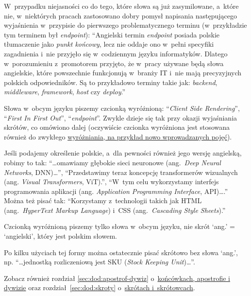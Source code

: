 W~przypadku niejasności co do tego, które słowa są już zasymilowane, a~które nie, w~niektórych pracach zastosowano dobry pomysł napisania następującego wyjaśnienia w~przypisie do pierwszego problematycznego terminu (w~przykładzie tym terminem był {\em endpoint}): ``Angielski termin {\em endpoint} posiada polskie tłumaczenie jako {\em punkt końcowy}, lecz nie oddaje ono w~pełni specyfiki zagadnienia i~nie przyjęło się w~codziennym języku informatyków. Dlatego 
w~porozumieniu z~promotorem przyjęto, że w~pracy używane będą słowa angielskie, które powszechnie funkcjonują w~branży IT i~nie mają precyzyjnych polskich odpowiedników. Są to przykładowo terminy takie jak: {\em backend}, {\em middleware}, {\em framework}, {\em host} czy {\em deploy}.''

Słowa w~obcym języku piszemy czcionką wyróżnioną: ``{\em Client Side Rendering}'', ``{\em First In First Out}'', ``{\em endpoint}''. Zwykle dzieje się tak przy okazji wyjaśniania skrótów, co omówiono dalej (oczywiście czcionka wyróżniona jest stosowana również do zwykłego \hyperref[sec:dod:pojecia-cudzyslowy]{wyróżniania, na przykład nowo wprowadzanych pojęć}).

Jeśli podajemy określenie polskie, a~dla pewności również jego wersję angielską, robimy to tak: ``\dots{}omawiamy głębokie sieci neuronowe (ang.\ {\em Deep Neural Networks}, DNN)\dots'', ``Przedstawimy teraz koncepcję transformerów wizualnych (ang. {\em Visual Transformers}, ViT).'', ``W~tym celu wykorzystamy interfejs programowania aplikacji (ang. {\em Application Programming Interface}, API)\dots.'' Można też pisać tak: ``Korzystamy z~technologii takich jak HTML (ang.\ {\em HyperText Markup Language}) i~CSS (ang.\ {\em Cascading Style Sheets}).'' 

Czcionką wyróżnioną piszemy tylko słowa w~obcym języku, nie skrót `ang.' = `angielski', który jest polskim słowem. 

Po kilku użyciach tej formy można ostatecznie pisać skrótowo bez słowa `ang.', np. ``\dots{}jed\-nost\-ką rozliczeniową jest SKU ({\em Stock Keeping Unit})\dots''.

Zobacz również rozdział \ref{sec:dod:apostrof-dywiz} o~\hyperref[sec:dod:apostrof-dywiz]{końcówkach, apostrofie i dywizie} oraz rozdział~\ref{sec:dod:skroty} o~\hyperref[sec:dod:skroty]{skrótach i~skrótowcach}.


